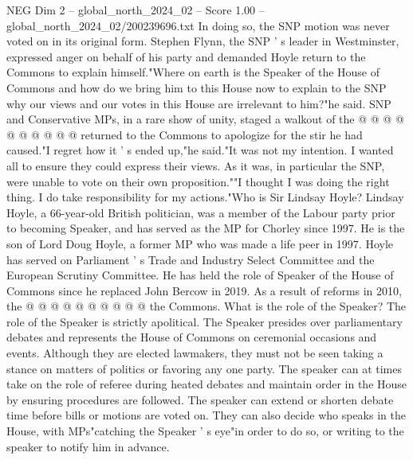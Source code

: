 \begin{textsample}{NEG Dim 2 – global\_north\_2024\_02 – Score 1.00 – global\_north\_2024\_02/200239696.txt}
In doing so, the SNP motion was never voted on in its original form.
Stephen Flynn, the SNP ' s leader in Westminster, expressed anger on behalf of his party and demanded Hoyle return to the Commons to explain himself."Where on earth is the Speaker of the House of Commons and how do we bring him to this House now to explain to the SNP why our views and our votes in this House are irrelevant to him?"he said.
SNP and Conservative MPs, in a rare show of unity, staged a walkout of the @ @ @ @ @ @ @ @ @ @ returned to the Commons to apologize for the stir he had caused."I regret how it ' s ended up,"he said."It was not my intention.
I wanted all to ensure they could express their views.
As it was, in particular the SNP, were unable to vote on their own proposition.""I thought I was doing the right thing.
I do take responsibility for my actions."Who is Sir Lindsay Hoyle?
Lindsay Hoyle, a 66-year-old British politician, was a member of the Labour party prior to becoming Speaker, and has served as the MP for Chorley since 1997.
He is the son of Lord Doug Hoyle, a former MP who was made a life peer in 1997.
Hoyle has served on Parliament ' s Trade and Industry Select Committee and the European Scrutiny Committee.
He has held the role of Speaker of the House of Commons since he replaced John Bercow in 2019.
As a result of reforms in 2010, the @ @ @ @ @ @ @ @ @ @ the Commons.
What is the role of the Speaker?
The role of the Speaker is strictly apolitical.
The Speaker presides over parliamentary debates and represents the House of Commons on ceremonial occasions and events.
Although they are elected lawmakers, they must not be seen taking a stance on matters of politics or favoring any one party.
The speaker can at times take on the role of referee during heated debates and maintain order in the House by ensuring procedures are followed.
The speaker can extend or shorten debate time before bills or motions are voted on.
They can also decide who speaks in the House, with MPs"catching the Speaker ' s eye"in order to do so, or writing to the speaker to notify him in advance.

\end{textsample}
